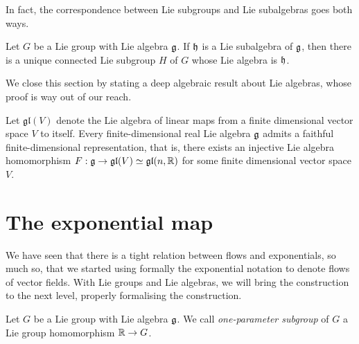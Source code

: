 In fact, the correspondence between Lie subgroups and Lie subalgebras goes both ways.

\begin{theorem}
  Let $G$ be a Lie group with Lie algebra $\mathfrak{g}$. If $\mathfrak{h}$ is a Lie subalgebra of $\mathfrak{g}$, then there is a unique connected Lie subgroup $H$ of $G$ whose Lie algebra is $\mathfrak{h}$.
\end{theorem}

We close this section by stating a deep algebraic result about Lie algebras, whose proof is way out of our reach.
\begin{theorem}
  Let $\mathfrak{gl}(V)$ denote the Lie algebra of linear maps from a finite dimensional vector space $V$ to itself.
  Every finite-dimensional real Lie algebra $\mathfrak{g}$ admits a faithful finite-dimensional representation, that is, there exists an injective Lie algebra homomorphism $F: \mathfrak{g} \to \mathfrak{gl}(V)\simeq\mathfrak{gl}(n,\mathbb{R})$ for some finite dimensional vector space $V$.
\end{theorem}

\section{The exponential map}

We have seen that there is a tight relation between flows and exponentials, so much so, that we started using formally the exponential notation to denote flows of vector fields.
With Lie groups and Lie algebras, we will bring the construction to the next level, properly formalising the construction.

\begin{definition}
  Let $G$ be a Lie group with Lie algebra $\mathfrak{g}$.
  We call \emph{one-parameter subgroup} of $G$ a Lie group homomorphism $\mathbb{R}\to G$.
\end{definition}

